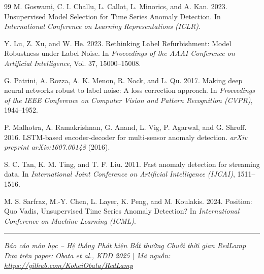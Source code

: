 \documentclass[sigconf,nonacm]{acmart}
\begin{document}
\begin{thebibliography}{99}
M. Goswami, C. I. Challu, L. Callot, L. Minorics, and A. Kan. 2023.
Unsupervised Model Selection for Time Series Anomaly Detection.
In \textit{International Conference on Learning Representations (ICLR)}.

Y. Lu, Z. Xu, and W. He. 2023.
Rethinking Label Refurbishment: Model Robustness under Label Noise.
In \textit{Proceedings of the AAAI Conference on Artificial Intelligence}, Vol. 37, 15000--15008.

G. Patrini, A. Rozza, A. K. Menon, R. Nock, and L. Qu. 2017.
Making deep neural networks robust to label noise: A loss correction approach.
In \textit{Proceedings of the IEEE Conference on Computer Vision and Pattern Recognition (CVPR)}, 1944--1952.

P. Malhotra, A. Ramakrishnan, G. Anand, L. Vig, P. Agarwal, and G. Shroff. 2016.
LSTM-based encoder-decoder for multi-sensor anomaly detection.
\textit{arXiv preprint arXiv:1607.00148} (2016).

S. C. Tan, K. M. Ting, and T. F. Liu. 2011.
Fast anomaly detection for streaming data.
In \textit{International Joint Conference on Artificial Intelligence (IJCAI)}, 1511--1516.

M. S. Sarfraz, M.-Y. Chen, L. Layer, K. Peng, and M. Koulakis. 2024.
Position: Quo Vadis, Unsupervised Time Series Anomaly Detection?
In \textit{International Conference on Machine Learning (ICML)}.

\end{thebibliography}

\vspace{6pt}
\noindent\rule{\columnwidth}{0.4pt}
\footnotesize
\noindent\textit{Báo cáo môn học -- Hệ thống Phát hiện Bất thường Chuỗi thời gian RedLamp}\\
\textit{Dựa trên paper: Obata et al., KDD 2025 $\mid$ Mã nguồn: \url{https://github.com/KoheiObata/RedLamp}}
\end{document}
